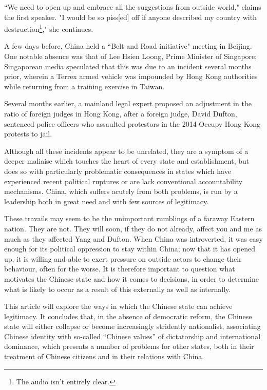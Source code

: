 \documentclass[1opt,a4paper]{article}
\newcounter{count}
\begin{document}
\begin{multicols}{2}
``We need to open up and embrace all the suggestions from outside world," claims the first speaker. "I would be so piss[ed] off if anyone described my country with destruction\footnote{The audio isn't entirely clear.}," she continues.

A few days before, China held a ``Belt and Road initiative" meeting in Beijing. One notable absence was that of Lee Hsien Loong, Prime Minister of Singapore; Singaporean media speculated that this was due to an incident several months prior, wherein a Terrex armed vehicle was impounded by Hong Kong authorities while returning from a training exercise in Taiwan\cite{beltroad}.

Several months earlier, a mainland legal expert proposed an adjustment in the ratio of foreign judges in Hong Kong, after a foreign judge, David Dufton, sentenced police officers who assaulted protestors in the 2014 Occupy Hong Kong protests to jail\cite{foreignjudge}.

Although all these incidents appear to be unrelated, they are a symptom of a deeper maliaise which touches the heart of every state and establishment, but does so with particularly problematic consequences in states which have experienced recent political ruptures or are lack conventional accountability mechanisms. China, which suffers acutely from both problems, is run by a leadership both in great need and with few sources of legitimacy.

These travails may seem to be the unimportant rumblings of a faraway Eastern nation. They are not. They will soon, if they do not already, affect you and me as much as they affected Yang and Dufton. When China was introverted, it was easy enough for its political oppression to stay within China; now that it has opened up, it is willing and able to exert pressure on outside actors to change their behaviour, often for the worse. It is therefore important to question what motivates the Chinese state and how it comes to decisions, in order to determine what is likely to occur as a result of this externally as well as internally.

This article will explore the ways in which the Chinese state can achieve legitimacy. It concludes that, in the absence of democratic reform, the Chinese state will either collapse or become increasingly stridently nationalist, associating Chinese identity with so-called ``Chinese values'' of dictatorship and international dominance, which presents a number of problems for other states, both in their treatment of Chinese citizens and in their relations with China.


\end{multicols}
\end{document}
